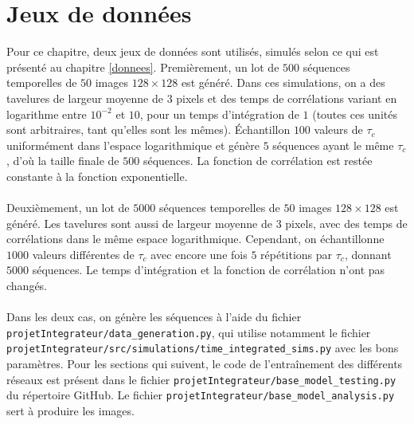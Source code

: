 \documentclass[MSc,french]{ulthese}
\begin{document}
\section{Jeux de données}
Pour ce chapitre, deux jeux de données sont utilisés, simulés selon ce qui est présenté au chapitre \ref{donnees}. Premièrement, un lot de $500$ séquences temporelles de $50$ images $128\times128$ est généré. Dans ces simulations, on a des tavelures de largeur moyenne de $3$ pixels et des temps de corrélations variant en logarithme entre $10^{-2}$ et $10$, pour un temps d'intégration de $1$ (toutes ces unités sont arbitraires, tant qu'elles sont les mêmes). Échantillon $100$ valeurs de $\tau_c$ uniformément dans l'espace logarithmique et génère $5$ séquences ayant le même $\tau_c$, d'où la taille finale de $500$ séquences. La fonction de corrélation est restée constante à la fonction exponentielle.
\\ \\
Deuxièmement, un lot de $5000$ séquences temporelles de $50$ images $128\times 128$ est généré. Les tavelures sont aussi de largeur moyenne de $3$ pixels, avec des temps de corrélations dans le même espace logarithmique. Cependant, on échantillonne $1000$ valeurs différentes de $\tau_c$ avec encore une fois $5$ répétitions par $\tau_c$, donnant $5000$ séquences. Le temps d'intégration et la fonction de corrélation n'ont pas changés.
\\ \\
Dans les deux cas, on génère les séquences à l'aide du fichier \texttt{projetIntegrateur/data\_generation.py}, qui utilise notamment le fichier \texttt{projetIntegrateur/src/simulations/time\_integrated\_sims.py} avec les bons paramètres. Pour les sections qui suivent, le code de l'entraînement des différents réseaux est présent dans le fichier \texttt{projetIntegrateur/base\_model\_testing.py} du répertoire GitHub. Le fichier \texttt{projetIntegrateur/base\_model\_analysis.py} sert à produire les images.
\end{document}

